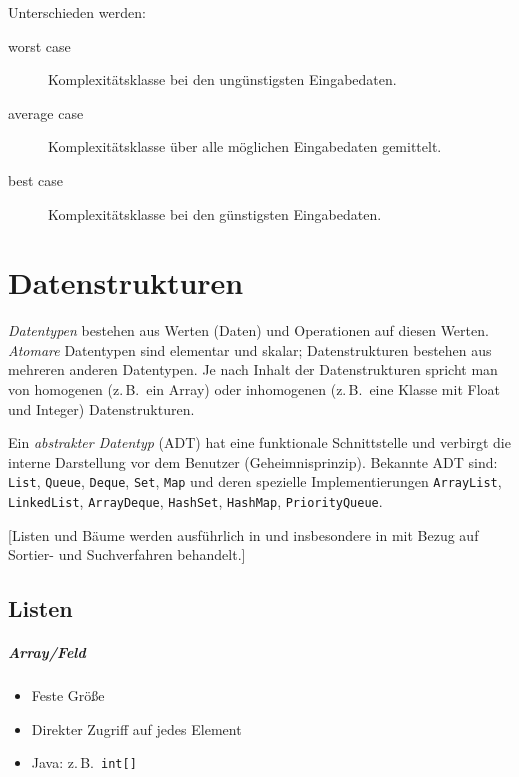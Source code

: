 Unterschieden werden:
\begin{description}
  \item[worst case] Komplexitätsklasse bei den ungünstigsten Eingabedaten.
  \item[average case] Komplexitätsklasse über alle möglichen Eingabedaten gemittelt.
  \item[best case] Komplexitätsklasse bei den günstigsten Eingabedaten.
\end{description}


\chapter{Datenstrukturen}
\emph{Datentypen} bestehen aus Werten (Daten) und Operationen auf diesen Werten.
\emph{Atomare} Datentypen sind elementar und skalar; Datenstrukturen bestehen aus mehreren anderen Datentypen.
Je nach Inhalt der Datenstrukturen spricht man von homogenen (z.\,B.~ein Array) oder inhomogenen (z.\,B.~eine Klasse mit Float und Integer) Datenstrukturen.

Ein \emph{abstrakter Datentyp} (ADT) hat eine funktionale Schnittstelle und verbirgt die interne Darstellung vor dem Benutzer (Geheimnisprinzip).
Bekannte ADT sind: \texttt{List}, \texttt{Queue}, \texttt{Deque}, \texttt{Set}, \texttt{Map} und deren spezielle Implementierungen \texttt{ArrayList}, \texttt{LinkedList}, \texttt{ArrayDeque}, \texttt{HashSet}, \texttt{HashMap}, \texttt{PriorityQueue}.

[Listen und Bäume werden ausführlich in \cite[S.~232--465]{TAOCP1} und insbesondere in \cite{TAOCP3} mit Bezug auf Sortier- und Suchverfahren behandelt.]

\section{Listen}
\paragraph{Array/Feld}
\begin{itemize}
  \item Feste Größe
  \item Direkter Zugriff auf jedes Element
  \item Java: z.\,B.~\texttt{int[]}
\end{itemize}

